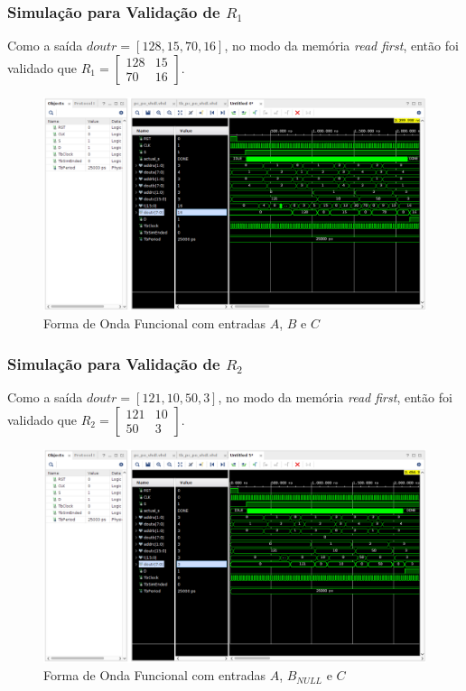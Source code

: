 \documentclass{beamer}
\begin{document}
    \begin{frame}
        \frametitle{Simulação para Validação de $ R_1 $}

        \begingroup {}
            Como a saída $ doutr = [128, 15, 70, 16] $, 
            no modo da memória \textit{read first}, então
            foi validado que $ R_1 = \begin{bmatrix} 128 & 15 \\ 70 & 16 \end{bmatrix} $.
        \endgroup

        \begin{figure}[h] 
            \centering
            \includegraphics[width=0.77\linewidth]{./images/solutions/PC-PO-Sim1.png}
            \caption{\label{img:pc-po-simulation-1} Forma de Onda Funcional com entradas $ A $, $ B $ e $ C $}
          \end{figure}
    \end{frame}

    \begin{frame}
        \frametitle{Simulação para Validação de $ R_2 $}

        \begingroup {}
            Como a saída $ doutr = [121, 10, 50, 3] $, 
            no modo da memória \textit{read first}, então
            foi validado que $ R_2 = \begin{bmatrix} 121 & 10 \\ 50 & 3 \end{bmatrix} $.
        \endgroup

        \begin{figure}[h] 
            \centering
            \includegraphics[width=0.77\linewidth]{./images/solutions/PC-PO-Sim2.png}
            \caption{\label{img:pc-po-simulation-2} Forma de Onda Funcional com entradas $ A $, $ B_{NULL} $ e $ C $}
          \end{figure}
    \end{frame}
\end{document}
